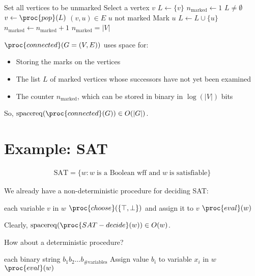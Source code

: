 \documentclass[a4paper]{report}
\newcommand{\bookref}[3]{\marginpar{\faBook{}~#1\\Chapter #2\\Section #3}}
\theoremstyle{definition}
\DeclareMathOperator*{\sreq}{spacereq}
\begin{document}
\begin{codebox}
\li Set all vertices to be unmarked
\li Select a vertex $v$
\li $L \gets \{v\}$
\li $n_{\text{marked}} \gets 1$
\li \While $L \neq \emptyset$ \Do
  \li $v \gets \proc{pop}(L)$
  \li \For $(v,u) \in E$ \Do
    \li \If $u$ not marked \Do
      \li Mark $u$
      \li $L \gets L \cup \{u\}$
      \li $n_{\text{marked}} \gets n_{\text{marked}} + 1$
    \End
  \End
\End
\li \If $n_{\text{marked}} = |V|$
\li \Then \Return {}
\End
\li \Return {}
\end{codebox}

$\proc{connected}(G = (V,E))$ uses space for:
\begin{itemize}
\item Storing the marks on the vertices
\item The list $L$ of marked vertices whose successors have not yet been examined
\item The counter $n_{\text{marked}}$, which can be stored in binary in $\log(|V|)$ bits
\end{itemize}

So, $\sreq(\proc{connected}(G)) \in O(|G|)$.

\section{Example: SAT}
\bookref{ER}{29}{29.1.1}
\vspace{-0.3cm}%
\begin{align*}
\text{SAT} = \{ w : w \;\text{is a Boolean wff and}\; w\; \text{is satisfiable} \}
\end{align*}

We already have a non-deterministic procedure for deciding SAT:
%
\begin{codebox}
\li \For each variable $v$ in $w$ \Do
\li $\proc{choose}(\{\top,\bot\})$ and assign it to $v$%
\End
\li \If $\proc{eval}(w)$
\li \Then \Return {}
\End
\li \Return {}
\end{codebox}

Clearly, $\sreq(\proc{SAT-decide}(w)) \in O(w)$.

How about a deterministic procedure?
%
\begin{codebox}
\li \For each binary string $b_1b_2\dots{}b_{\text{\#variables}}$ \Do
\li Assign value $b_i$ to variable $x_i$ in $w$
\li \If $\proc{eval}(w)$
\li \Then \Return {}
\End
\End
\li \Return {}
\end{codebox}
\end{document}
